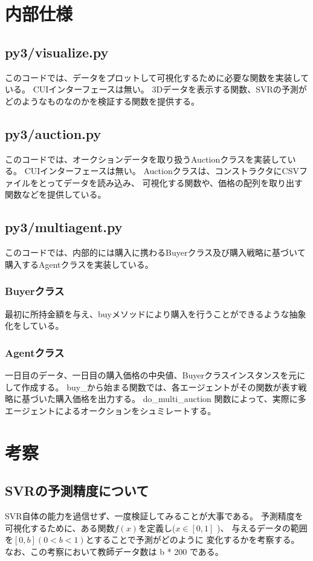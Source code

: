 \documentclass[]{jsarticle}
\begin{document}
\section{内部仕様}
\subsection{py3/visualize.py}
このコードでは、データをプロットして可視化するために必要な関数を実装している。
CUIインターフェースは無い。
3Dデータを表示する関数、SVRの予測がどのようなものなのかを検証する関数を提供する。

\subsection{py3/auction.py}
このコードでは、オークションデータを取り扱うAuctionクラスを実装している。
CUIインターフェースは無い。
Auctionクラスは、コンストラクタにCSVファイルをとってデータを読み込み、
可視化する関数や、価格の配列を取り出す関数などを提供している。


\subsection{py3/multiagent.py}
このコードでは、内部的には購入に携わるBuyerクラス及び購入戦略に基づいて購入するAgentクラスを実装している。
\subsubsection{Buyerクラス}
最初に所持金額を与え、buyメソッドにより購入を行うことができるような抽象化をしている。
\subsubsection{Agentクラス}
一日目のデータ、一日目の購入価格の中央値、Buyerクラスインスタンスを元にして作成する。
buy\_から始まる関数では、各エージェントがその関数が表す戦略に基づいた購入価格を出力する。
do\_multi\_auction 関数によって、実際に多エージェントによるオークションをシュミレートする。

\section{考察}
\subsection{SVRの予測精度について}
SVR自体の能力を過信せず、一度検証してみることが大事である。
予測精度を可視化するために、ある関数$f(x)$を定義し($x \in [0,1]$ )、
与えるデータの範囲を$[0,b](0<b<1)$とすることで予測がどのように
変化するかを考察する。
なお、この考察において教師データ数は b * 200 である。
\newpage
\end{document}
